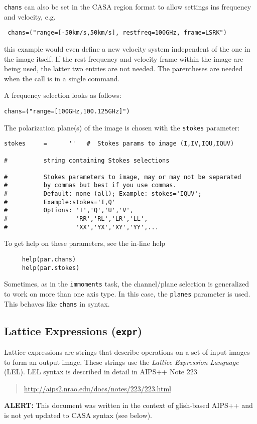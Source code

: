 {\tt chans} can also be set in the CASA region format to allow
settings ins frequency and velocity, e.g.
\small
\begin{verbatim}
 chans=("range=[-50km/s,50km/s], restfreq=100GHz, frame=LSRK")
\end{verbatim}
\normalsize
this example would even define a new velocity system independent of
the one in the image itself. If the rest frequency and velocity frame
within the image are being used, the latter two entries are not
needed. The parentheses are needed when the call is in a single
command. 

A frequency selection looks as follows:

\small
\begin{verbatim} 
chans=("range=[100GHz,100.125GHz]")
\end{verbatim}
\normalsize


The polarization plane(s) of the image is chosen with the {\tt stokes}
parameter:
\small
\begin{verbatim}
stokes     =      ''   #  Stokes params to image (I,IV,IQU,IQUV)

#          string containing Stokes selections

#          Stokes parameters to image, may or may not be separated
#          by commas but best if you use commas.
#          Default: none (all); Example: stokes='IQUV';  
#          Example:stokes='I,Q'
#          Options: 'I','Q','U','V',
#                   'RR','RL','LR','LL',
#                   'XX','YX','XY','YY',...
\end{verbatim}
\normalsize

To get help on these parameters, see the in-line help
\small
\begin{verbatim}
     help(par.chans)
     help(par.stokes)
\end{verbatim}
\normalsize

Sometimes, as in the {\tt immoments} task, the channel/plane 
selection is generalized to work on more than one axis type.
In this case, the {\tt planes} parameter is used.  This behaves
like {\tt chans} in syntax.

\subsection{Lattice Expressions ({\tt expr})}
\label{section:analysis.pars.lattice}

Lattice expressions are strings that describe operations on a
set of input images to form an output image.  These strings
use the {\em Lattice Expression Language} (LEL).  LEL syntax
is described in detail in AIPS++ Note 223 
\begin{quote}
   \url{http://aips2.nrao.edu/docs/notes/223/223.html}
\end{quote}
{\bf ALERT:} This document was written in the context of
glish-based AIPS++ and is not yet updated to CASA syntax 
(see below).

